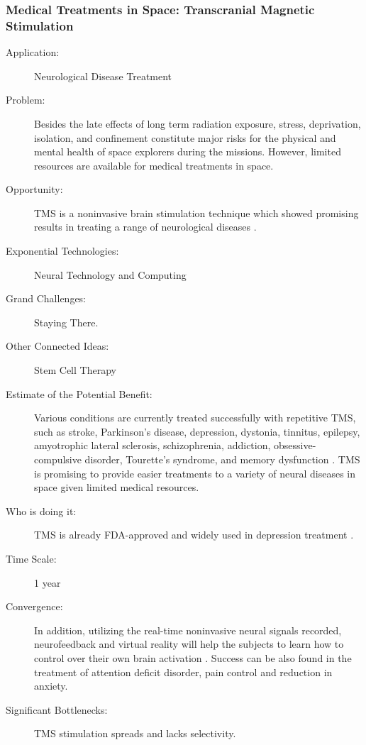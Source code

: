 \subsubsection{Medical Treatments in Space:  Transcranial Magnetic Stimulation}
\begin{description}  \item[Application:] Neurological Disease Treatment
 
\item[Problem:] Besides the late  effects of long term radiation exposure, stress, deprivation, isolation,  and confinement constitute major risks for the physical and mental  health of space explorers during the missions. However, limited  resources are available for medical treatments in space.
 
\item[Opportunity:]  \gls{TMS} is a noninvasive brain  stimulation technique which showed promising results in treating a range  of neurological diseases \cite{Ridding2007}.
 
\item[Exponential Technologies:]  Neural Technology and Computing
 
\item[Grand Challenges:] Staying There.
 
\item[Other  Connected Ideas:] Stem Cell Therapy
 
\item[Estimate of the Potential  Benefit:]Various conditions are currently treated successfully with  repetitive \gls{TMS}, such as stroke, Parkinson's disease, depression,  dystonia, tinnitus, epilepsy, amyotrophic lateral sclerosis,  schizophrenia, addiction, obsessive-compulsive disorder, Tourette's syndrome, and memory dysfunction \cite{Ridding2007}. \gls{TMS} is promising to provide  easier treatments to a variety of neural diseases in space given limited  medical resources.
 
\item[Who  is doing it:] \gls{TMS} is already FDA-approved and widely used in depression  treatment \cite{Ridding2007}.
 
\item[Time Scale:] 1 year
 
\item[Convergence:]  In addition, utilizing the real-time noninvasive neural signals  recorded, neurofeedback and virtual reality will help the subjects to  learn how to control over their own brain activation  \cite{deCharms2008}. Success can be also found in the treatment of  attention deficit disorder, pain control and reduction in anxiety. 
 
\item[Significant  Bottlenecks:] \gls{TMS} stimulation spreads and lacks selectivity. 
 
\end{description}

